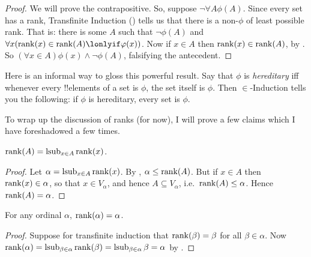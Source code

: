 \documentclass[../../../include/open-logic-section]{subfiles}
\begin{document}
\begin{proof}
We will prove the contrapositive. So, suppose $\lnot \forall A
\phi(A)$. Since every set has a rank, Transfinite Induction
() tells us that there
is a non-$\phi$ of least possible rank. That is: there is some $A$
such that $\lnot \phi(A)$ and $\forall x(\setrank{x} \in \setrank{A}
\lonlyif \phi(x))$. Now if $x \in A$ then $\mathrm{rank}(x) \in
\mathrm{rank}(A)$, by . So $(\forall x \in
A)\phi(x) \land \lnot \phi(A)$, falsifying the antecedent.
\end{proof}\noindent Here is an informal way to gloss this powerful
result. Say that $\phi$ is \emph{hereditary} iff whenever every
!!{element}s of a set is $\phi$, the set itself is $\phi$. Then
$\in$-Induction tells you the following: if $\phi$ is hereditary,
every set is $\phi$.

To wrap up the discussion of ranks (for now), I will prove a few
claims which I have foreshadowed a few times. 

\begin{prop}
$\mathrm{rank}(A) = \operatorname*{\mathrm{lsub}}_{x \in A}\mathrm{rank}(x)$.
\end{prop}

\begin{proof}
Let $\alpha = \operatorname*{\mathrm{lsub}}_{x \in A}\mathrm{rank}(x)$. By
, $\alpha \leq \mathrm{rank}(A)$. But if $x \in A$
then $\mathrm{rank}(x) \in \alpha$, so that $x \in V_\alpha$, and hence $A
\subseteq V_\alpha$, i.e.\ $\mathrm{rank}(A) \leq \alpha$. Hence
$\mathrm{rank}(A) = \alpha$.
\end{proof}

\begin{cor}
For any ordinal $\alpha$, $\mathrm{rank}(\alpha) = \alpha$.
\end{cor}

\begin{proof}
Suppose for transfinite induction that $\mathrm{rank}(\beta) = \beta$ for
all $\beta \in \alpha$. Now $\mathrm{rank}(\alpha) = \operatorname*{\mathrm{lsub}}_{\beta \in
\alpha}\mathrm{rank}(\beta) = \operatorname*{\mathrm{lsub}}_{\beta \in \alpha}\beta = \alpha$
by .
%
\end{proof}
\end{document}

